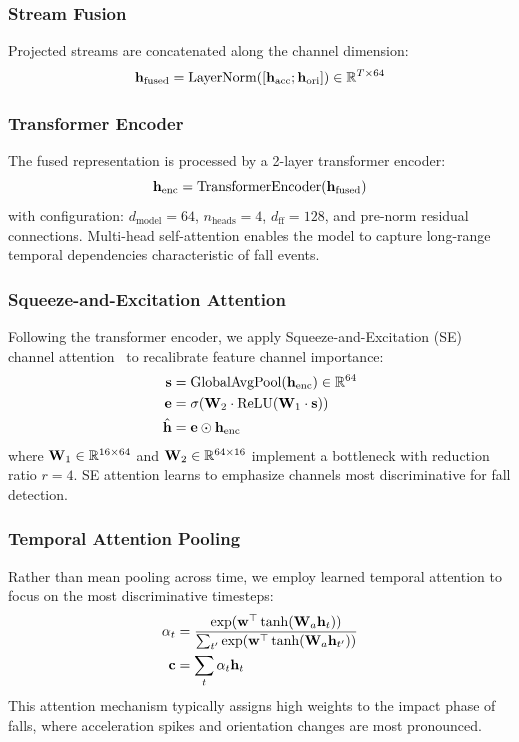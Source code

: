 \subsubsection{Stream Fusion}
Projected streams are concatenated along the channel dimension:
\begin{equation}
\mathbf{h}_\text{fused} = \text{LayerNorm}([\mathbf{h}_\text{acc}; \mathbf{h}_\text{ori}]) \in \mathbb{R}^{T \times 64}
\end{equation}

\subsubsection{Transformer Encoder}
The fused representation is processed by a 2-layer transformer encoder:
\begin{equation}
\mathbf{h}_\text{enc} = \text{TransformerEncoder}(\mathbf{h}_\text{fused})
\end{equation}
with configuration: $d_\text{model}=64$, $n_\text{heads}=4$, $d_\text{ff}=128$, and pre-norm residual connections. Multi-head self-attention enables the model to capture long-range temporal dependencies characteristic of fall events.

\subsubsection{Squeeze-and-Excitation Attention}
Following the transformer encoder, we apply Squeeze-and-Excitation (SE) channel attention~\cite{hu2018squeeze} to recalibrate feature channel importance:
\begin{align}
\mathbf{s} &= \text{GlobalAvgPool}(\mathbf{h}_\text{enc}) \in \mathbb{R}^{64} \\
\mathbf{e} &= \sigma(\mathbf{W}_2 \cdot \text{ReLU}(\mathbf{W}_1 \cdot \mathbf{s})) \\
\hat{\mathbf{h}} &= \mathbf{e} \odot \mathbf{h}_\text{enc}
\end{align}
where $\mathbf{W}_1 \in \mathbb{R}^{16 \times 64}$ and $\mathbf{W}_2 \in \mathbb{R}^{64 \times 16}$ implement a bottleneck with reduction ratio $r=4$. SE attention learns to emphasize channels most discriminative for fall detection.

\subsubsection{Temporal Attention Pooling}
Rather than mean pooling across time, we employ learned temporal attention to focus on the most discriminative timesteps:
\begin{align}
\alpha_t &= \frac{\exp(\mathbf{w}^\top \tanh(\mathbf{W}_a \mathbf{h}_t))}{\sum_{t'} \exp(\mathbf{w}^\top \tanh(\mathbf{W}_a \mathbf{h}_{t'}))} \\
\mathbf{c} &= \sum_t \alpha_t \mathbf{h}_t
\end{align}
This attention mechanism typically assigns high weights to the impact phase of falls, where acceleration spikes and orientation changes are most pronounced.

